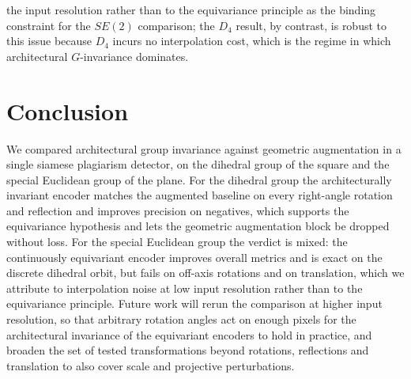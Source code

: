 \documentclass{article}
\begin{document}
the input resolution rather than to the equivariance principle as the binding constraint for the $SE(2)$ comparison; the $D_4$ result, by contrast, is robust to this issue because $D_4$ incurs no interpolation cost, which is the regime in which architectural $G$-invariance dominates.

\section{Conclusion}\label{sec:concl}

We compared architectural group invariance against geometric augmentation in a single siamese plagiarism detector, on the dihedral group of the square and the special Euclidean group of the plane. For the dihedral group the architecturally invariant encoder matches the augmented baseline on every right-angle rotation and reflection and improves precision on negatives, which supports the equivariance hypothesis and lets the geometric augmentation block be dropped without loss. For the special Euclidean group the verdict is mixed: the continuously equivariant encoder improves overall metrics and is exact on the discrete dihedral orbit, but fails on off-axis rotations and on translation, which we attribute to interpolation noise at low input resolution rather than to the equivariance principle. Future work will rerun the comparison at higher input resolution, so that arbitrary rotation angles act on enough pixels for the architectural invariance of the equivariant encoders to hold in practice, and broaden the set of tested transformations beyond rotations, reflections and translation to also cover scale and projective perturbations.



\end{document}
